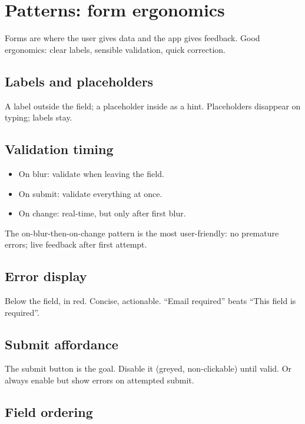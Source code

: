 \chapter{Patterns: form ergonomics}
\label{ch:formergo}

\begin{aside}
Forms are where the user gives data and the app gives
feedback. Good ergonomics: clear labels, sensible validation,
quick correction.
\end{aside}

\section{Labels and placeholders}

A label outside the field; a placeholder inside as a hint.
Placeholders disappear on typing; labels stay.

\section{Validation timing}

\begin{itemize}[leftmargin=*]
  \item On blur: validate when leaving the field.
  \item On submit: validate everything at once.
  \item On change: real-time, but only after first blur.
\end{itemize}

The on-blur-then-on-change pattern is the most user-friendly:
no premature errors; live feedback after first attempt.

\section{Error display}

Below the field, in red. Concise, actionable. ``Email
required'' beats ``This field is required''.

\section{Submit affordance}

The submit button is the goal. Disable it (greyed,
non-clickable) until valid. Or always enable but show
errors on attempted submit.

\section{Field ordering}

